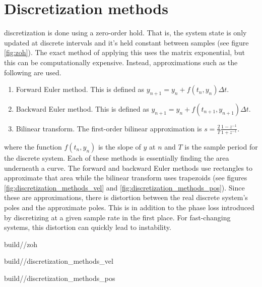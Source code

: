 \section{Discretization methods}

\Gls{discretization} is done using a zero-order hold. That is, the \gls{system}
\gls{state} is only updated at discrete intervals and it's held constant between
samples (see figure \ref{fig:zoh}). The exact method of applying this uses the
matrix exponential, but this can be computationally expensive. Instead,
approximations such as the following are used.

\begin{enumerate}
  \item Forward Euler method. This is defined as
    $y_{n+1} = y_n + f(t_n, y_n) \Delta t$.
  \item Backward Euler method. This is defined as
    $y_{n+1} = y_n + f(t_{n+1}, y_{n+1}) \Delta t$.
  \item Bilinear transform. The first-order bilinear approximation is
    $s = \frac{2}{T} \frac{1 - z^{-1}}{1 + z^{-1}}$.
\end{enumerate}

where the function $f(t_n, y_n)$ is the slope of $y$ at $n$ and $T$ is the
sample period for the discrete \gls{system}. Each of these methods is
essentially finding the area underneath a curve. The forward and backward Euler
methods use rectangles to approximate that area while the bilinear transform
uses trapezoids (see figures \ref{fig:discretization_methods_vel} and
\ref{fig:discretization_methods_pos}). Since these are approximations, there is
distortion between the real discrete \gls{system}'s poles and the approximate
poles. This is in addition to the phase loss introduced by discretizing at a
given sample rate in the first place. For fast-changing \glspl{system}, this
distortion can quickly lead to instability.

\begin{svg}{build/\chapterpath/zoh}
    \caption{Zero-order hold of a system response}
    \label{fig:zoh}
\end{svg}

\begin{svg}{build/\chapterpath/discretization_methods_vel}
  \caption{Discretization methods applied to velocity data}
  \label{fig:discretization_methods_vel}
\end{svg}

\begin{svg}{build/\chapterpath/discretization_methods_pos}
  \caption{Position plot of discretization methods applied to velocity data}
  \label{fig:discretization_methods_pos}
\end{svg}
